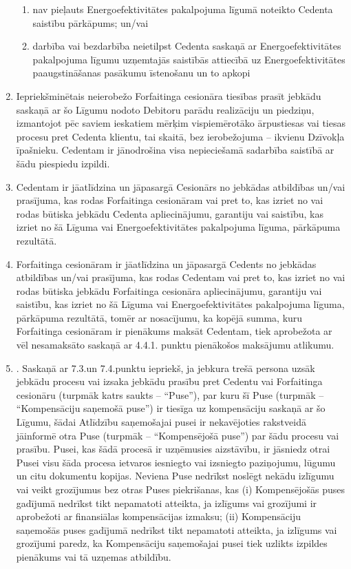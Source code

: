 \documentclass[a4paper]{article}
\begin{document}
\begin{multicols}{2}
\begin{enumerate}
    \begin{enumerate}
    \item{nav pieļauts Energoefektivitātes pakalpojuma līgumā
noteikto Cedenta saistību pārkāpums; un/vai}

    \item{darbība vai bezdarbība neietilpst Cedenta saskaņā ar
Energoefektivitātes pakalpojuma līgumu uzņemtajās saistībās attiecībā
uz Energoefektivitātes paaugstināšanas pasākumu īstenošanu un to
apkopi }
    \end{enumerate}

  \item{Iepriekšminētais neierobežo Forfaitinga cesionāra tiesības prasīt
jebkādu saskaņā ar šo Līgumu nodoto Debitoru parādu realizāciju un
piedziņu, izmantojot pēc saviem ieskatiem mērķim vispiemērotāko
ārpustiesas vai tiesas procesu pret Cedenta klientu, tai skaitā, bez
ierobežojuma – ikvienu Dzīvokļa īpašnieku. Cedentam ir jānodrošina
visa nepieciešamā sadarbība saistībā ar šādu piespiedu izpildi.}

  \item{Cedentam ir jāatlīdzina un jāpasargā Cesionārs no jebkādas atbildības
un/vai prasījuma, kas rodas Forfaitinga cesionāram vai pret to, kas izriet
no vai rodas būtiska jebkādu Cedenta apliecinājumu, garantiju vai
saistību, kas izriet no šā Līguma vai Energoefektivitātes pakalpojuma
līguma, pārkāpuma rezultātā.}

  \item{Forfaitinga cesionāram ir jāatlīdzina un jāpasargā Cedents no jebkādas
atbildības un/vai prasījuma, kas rodas Cedentam vai pret to, kas izriet no vai rodas būtiska jebkādu Forfaitinga cesionāra apliecinājumu,
garantiju vai saistību, kas izriet no šā Līguma vai Energoefektivitātes
pakalpojuma līguma, pārkāpuma rezultātā, tomēr ar nosacījumu, ka
kopējā summa, kuru Forfaitinga cesionāram ir pienākums maksāt
Cedentam, tiek aprobežota ar vēl nesamaksāto saskaņā ar 4.4.1.
punktu pienākošos maksājumu atlikumu.}

  \item{. Saskaņā ar 7.3.un 7.4.punktu iepriekš, ja jebkura trešā persona uzsāk
jebkādu procesu vai izsaka jebkādu prasību pret Cedentu vai Forfaitinga
cesionāru (turpmāk katrs saukts – “Puse”), par kuru šī Puse (turpmāk –
“Kompensāciju saņemošā puse”) ir tiesīga uz kompensāciju saskaņā ar
šo Līgumu, šādai Atlīdzību saņemošajai pusei ir nekavējoties rakstveidā
jāinformē otra Puse (turpmāk – “Kompensējošā puse”) par šādu
procesu vai prasību. Pusei, kas šādā procesā ir uzņēmusies aizstāvību,
ir jāsniedz otrai Pusei visu šāda procesa ietvaros iesniegto vai izsniegto
paziņojumu, lūgumu un citu dokumentu kopijas. Neviena Puse nedrīkst
noslēgt nekādu izlīgumu vai veikt grozījumus bez otras Puses
piekrišanas, kas (i) Kompensējošās puses gadījumā nedrīkst tikt
nepamatoti atteikta, ja izlīgums vai grozījumi ir aprobežoti ar finansiālas
kompensācijas izmaksu; (ii) Kompensāciju saņemošās puses gadījumā
nedrīkst tikt nepamatoti atteikta, ja izlīgums vai grozījumi paredz, ka
Kompensāciju saņemošajai pusei tiek uzlikts izpildes pienākums vai tā
uzņemas atbildību. }


\end{enumerate}
\end{multicols}
\end{document}
